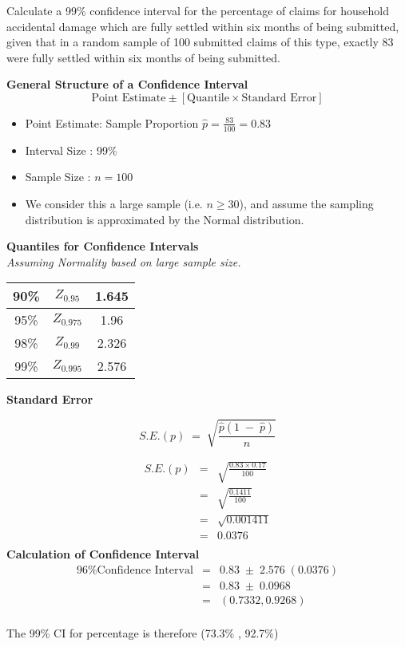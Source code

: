 \documentclass[a4paper,12pt]{article}
\begin{document}
\large
\noindent Calculate a 99\% confidence interval for the percentage of claims for household accidental damage which are fully settled within six months of being submitted, given
that in a random sample of 100 submitted claims of this type, exactly 83 were fully settled within six months of being submitted.

\begin{framed}
\noindent \textbf{General Structure of a Confidence Interval}
\[  \mbox{Point Estimate} \pm \left[ \mbox{Quantile} \times \mbox{Standard Error}\right]\]
\end{framed}
\begin{itemize}
\item Point Estimate: Sample Proportion ${ \displaystyle \hat{p} = \frac{83}{100} = 0.83 }$
\item Interval Size : 99\%
\item Sample Size : $n=100$
\item We consider this a large sample (i.e. $n \geq 30$), and assume the sampling distribution is approximated by the Normal distribution.
\end{itemize}
\noindent \textbf{Quantiles for Confidence Intervals}
\\ \textit{ Assuming Normality based on large sample size.}\\
\begin{center}
\begin{tabular}{|c|c|c|} \hline
90\%     & $Z_{0.95}$ & 1.645 \\ \hline
95\%     & $Z_{0.975}$ & 1.96 \\ \hline
98\%    & $Z_{0.99}$ & 2.326    \\ \hline
99\%    & $Z_{0.995}$ &  2.576  \\ \hline
\end{tabular}
\end{center}
\newpage
\noindent \textbf{Standard Error}
\begin{framed}
\[ S.E.(p) \;=\; \sqrt{ \frac{\hat{p} (1\;-\;\hat{p})  }{n}  } \]
\end{framed}
\begin{eqnarray*} S.E.(p) &=& \sqrt{ \frac{0.83 \times 0.17 }{100}  }\\
&=& \sqrt{ \frac{0.1411}{100}  }\\
&=& \sqrt{ 0.001411 }\\
&=& 0.0376 \\
\end{eqnarray*}
\medskip
\noindent \textbf{Calculation of Confidence Interval}
\begin{eqnarray*}
\mbox{96\% Confidence Interval} &=& 0.83 \;\pm\; 2.576\;(0.0376)\\
&=& 0.83 \;\pm\; 0.0968 \\
&=& (0.7332, 0.9268)\\
\end{eqnarray*}

The 99\% CI for percentage is therefore (73.3\% , 92.7\%)
\end{document}
